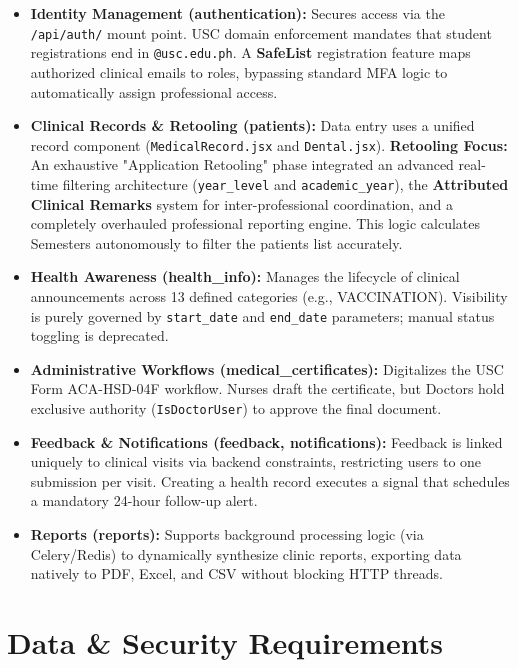 \begin{itemize}
    \item \textbf{Identity Management (authentication):} Secures access via the \texttt{/api/auth/} mount point. USC domain enforcement mandates that student registrations end in \texttt{@usc.edu.ph}. A \textbf{SafeList} registration feature maps authorized clinical emails to roles, bypassing standard MFA logic to automatically assign professional access.
    \item \textbf{Clinical Records \& Retooling (patients):} Data entry uses a unified record component (\texttt{MedicalRecord.jsx} and \texttt{Dental.jsx}). \textbf{Retooling Focus:} An exhaustive "Application Retooling" phase integrated an advanced real-time filtering architecture (\texttt{year\_level} and \texttt{academic\_year}), the \textbf{Attributed Clinical Remarks} system for inter-professional coordination, and a completely overhauled professional reporting engine. This logic calculates Semesters autonomously to filter the patients list accurately.
    \item \textbf{Health Awareness (health\_info):} Manages the lifecycle of clinical announcements across 13 defined categories (e.g., VACCINATION). Visibility is purely governed by \texttt{start\_date} and \texttt{end\_date} parameters; manual status toggling is deprecated.
    \item \textbf{Administrative Workflows (medical\_certificates):} Digitalizes the USC Form ACA-HSD-04F workflow. Nurses draft the certificate, but Doctors hold exclusive authority (\texttt{IsDoctorUser}) to approve the final document.
    \item \textbf{Feedback \& Notifications (feedback, notifications):} Feedback is linked uniquely to clinical visits via backend constraints, restricting users to one submission per visit. Creating a health record executes a signal that schedules a mandatory 24-hour follow-up alert.
    \item \textbf{Reports (reports):} Supports background processing logic (via Celery/Redis) to dynamically synthesize clinic reports, exporting data natively to PDF, Excel, and CSV without blocking HTTP threads.
\end{itemize}

\section{Data \& Security Requirements}

